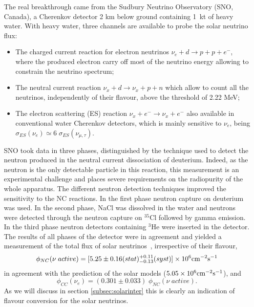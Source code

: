 The real breakthrough came from the Sudbury Neutrino Observatory (SNO, Canada), a Cherenkov detector 2 km below ground containing 1~kt of heavy water. 
With heavy water, three channels are available to probe the solar neutrino flux: 
\begin{itemize}
\item The charged current reaction for electron neutrinos $ \nu_e + d \rightarrow p + p + e^-$, where the produced electron carry off most of the neutrino energy allowing to constrain the neutrino spectrum;
\item The neutral current reaction $ \nu_x + d \rightarrow \nu_x +  p + n $ which allow to count all the neutrinos, independently of their flavour, above the threshold of 2.22 MeV; 
\item The electron scattering (ES) reaction $ \nu_x + e^- \rightarrow \nu_x + e^-$ also available in conventional water Cherenkov detectors, which is mainly sensitive to $ \nu_e$, being $\sigma_{ES}(\nu_e)\simeq 6 \; \sigma_{ES}(\nu_{\mu, \tau})$. 
\end{itemize}
SNO took data in three phases, distinguished by the technique used to detect the neutron produced in the neutral current dissociation of deuterium. Indeed, as the neutron is the only detectable particle in this reaction, this measurement is an experimental challenge and places severe requirements on the radiopurity of the whole apparatus. The different neutron detection techniques improved the sensitivity to the NC reactions. In the first phase neutron capture on deuterium was used. In the second phase, NaCl was dissolved in the water and neutrons were detected through the neutron capture on $^{35}$Cl followed by gamma emission. In the third phase neutron detectors containing $^3$He were inserted in the detector.
The results of all phases of the detector were in agreement and yielded a measurement of the total flux of solar neutrinos~\cite{aharmim}, irrespective of their flavour,
\begin{equation}
\phi_{NC} (\nu \; active ) = [5.25 \pm 0.16 (stat) ^{+0.11}
_{-0.13} (syst)] \times 10^6 {\rm cm^{-2} s^{-1}} 
\end{equation}
in agreement with the prediction of the solar models ($5.05 \times 10^6 {\rm cm^{-2} s^{-1}}$), and 
\begin{equation}
\phi_{CC} (\nu_e ) =  (0.301 \pm 0.033) \; \phi_{NC} (\nu \; active ).
\end{equation}
As we will discuss in section
 \ref{subsec:solarinter} this is clearly an indication of flavour conversion for the solar neutrinos. 

